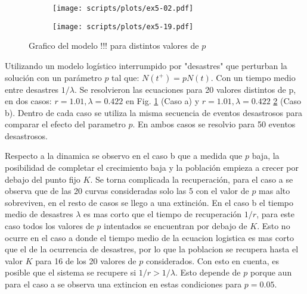 \documentclass[twocolumn,aps,prl]{revtex4-1}
\begin{document}
\begin{figure*}[ht!]
    \centering
    \begin{subfigure}[b]{0.9\linewidth}
        \centering
        \texttt{[image: scripts/plots/ex5-02.pdf]}
        \caption{}
        \label{fig:scripts/plots/ex5-02}
    \end{subfigure}\quad
    \begin{subfigure}[b]{0.9\linewidth}
        \centering
        \texttt{[image: scripts/plots/ex5-19.pdf]}
        \caption{}
        \label{fig:scripts/plots/ex5-19}
    \end{subfigure}\quad
    \caption{Grafico del modelo !!! para distintos valores de $p$}
    \label{fig:scripts/plots/ex5}
\end{figure*}

Utilizando un modelo logístico interrumpido por "desastres" que perturban la solución con un parámetro $p$ tal que: $N(t^+)=pN(t)$. Con un tiempo medio entre desastres $1/\lambda$. Se resolvieron las ecuaciones para 20 valores distintos de p, en dos casos: $r = \text{1.01}, \lambda = \text{0.422}$ en Fig. \ref{fig:scripts/plots/ex5-02} (Caso a) y $r = \text{1.01}, \lambda = \text{0.422}$ \ref{fig:scripts/plots/ex5-19} (Caso b). Dentro de cada caso se utiliza la misma secuencia de eventos desastrosos para comparar el efecto del parametro $p$. En ambos casos se resolvio para 50 eventos desastrosos. 

Respecto a la dinamica se observo en el caso b que a medida que $p$ baja, la posibilidad de completar el crecimiento baja y la población empieza a crecer por debajo del punto fijo $K$. Se torna complicada la recuperación, para el caso a se observa que de las 20 curvas consideradas solo las 5 con el valor de $p$ mas alto sobreviven, en el resto de casos se llego a una extinción. 
En el caso b el tiempo medio de desastres $\lambda$ es mas corto que el tiempo de recuperación $1/r$, para este caso todos los valores de $p$ intentados se encuentran por debajo de $K$. Esto no ocurre en el caso a donde el tiempo medio de la ecuacion logistica es mas corto que el de la ocurrencia de desastres, por lo que la poblacion se recupera hasta el valor $K$ para 16 de los 20 valores de $p$ considerados. Con esto en cuenta, es posible que el sistema se recupere si $1/r > 1/\lambda$. Esto depende de $p$ porque aun para el caso a se observa una extincion en estas condiciones para $p =\text{0.05}$.
\end{document}
